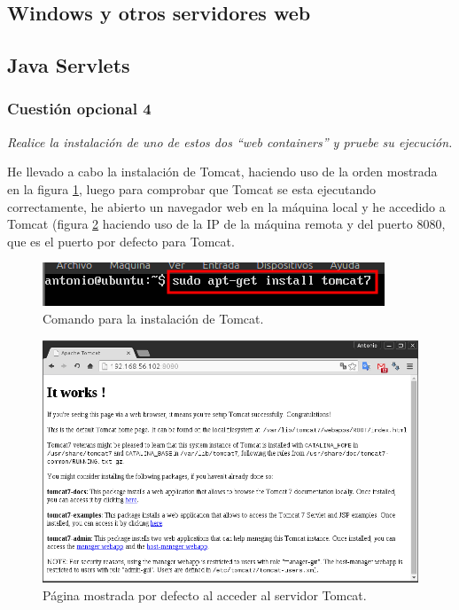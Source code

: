 \subsection{Windows y otros servidores web}





\subsection{Java Servlets}
\subsubsection{Cuestión opcional 4}
\textit{Realice la instalación de uno de estos dos “web containers” y pruebe su ejecución.}
\newline

He llevado a cabo la instalación de Tomcat, haciendo uso de la orden mostrada en la figura \ref{tc1}, luego para comprobar que Tomcat se esta ejecutando correctamente, he abierto un navegador web en la máquina local y he accedido a Tomcat (figura \ref{tc2} haciendo uso de la IP de la máquina remota y del puerto 8080, que es el puerto por defecto para Tomcat. \cite{tomcat}

\begin{figure}[H]
    \begin{center}
        \includegraphics[scale=0.8]{imagenes/tc1}
        \caption{Comando para la instalación de Tomcat.}
        \label{tc1}
    \end{center}
\end{figure}

\begin{figure}[H]
    \begin{center}
        \includegraphics[scale=0.5]{imagenes/tc2}
        \caption{Página mostrada por defecto al acceder al servidor Tomcat.}
        \label{tc2}
    \end{center}
\end{figure}




